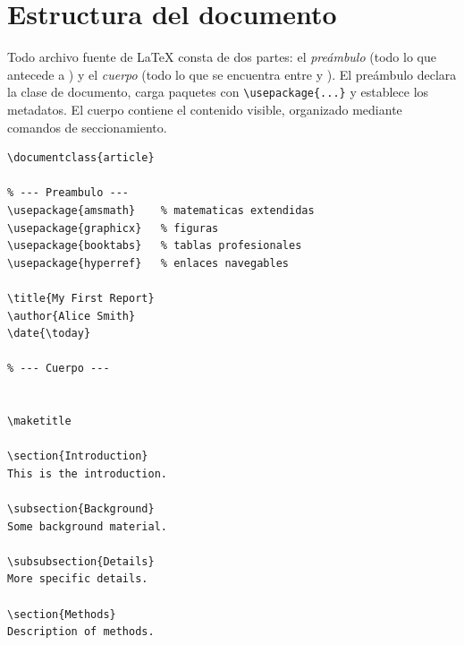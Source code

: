 \section{Estructura del documento}
\label{sec:latex-structure}

Todo archivo fuente de \LaTeX{} consta de dos partes: el
\emph{preámbulo} (todo lo que antecede a \verb||) y el
\emph{cuerpo} (todo lo que se encuentra entre \verb||
y \verb||). El preámbulo declara la clase de documento,
carga paquetes con \verb|\usepackage{...}| y establece los metadatos.
El cuerpo contiene el contenido visible, organizado mediante comandos
de seccionamiento.

\begin{lstlisting}[style=inlineStyle, caption={Documento mínimo compilable con preámbulo y seccionamiento}]
\documentclass{article}

% --- Preambulo ---
\usepackage{amsmath}    % matematicas extendidas
\usepackage{graphicx}   % figuras
\usepackage{booktabs}   % tablas profesionales
\usepackage{hyperref}   % enlaces navegables

\title{My First Report}
\author{Alice Smith}
\date{\today}

% --- Cuerpo ---


\maketitle

\section{Introduction}
This is the introduction.

\subsection{Background}
Some background material.

\subsubsection{Details}
More specific details.

\section{Methods}
Description of methods.


\end{lstlisting}


